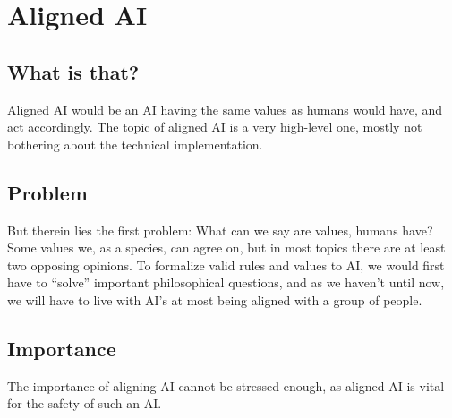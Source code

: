 \chapter{Aligned AI}

\section{What is that?}
Aligned AI would be an AI having the same values as humans would have, and act accordingly. The topic of aligned AI is a very high-level one, mostly not bothering about the technical implementation.
\section{Problem}
But therein lies the first problem: What can we say are values, humans have? Some values we, as a species, can agree on, but in most topics there are at least two opposing opinions. To formalize valid rules and values to AI, we would first have to “solve” important philosophical questions, and as we haven't until now, we will have to live with AI's at most being aligned with a group of people.
\section{Importance}
The importance of aligning AI cannot be stressed enough, as aligned AI is vital for the safety of such an AI.